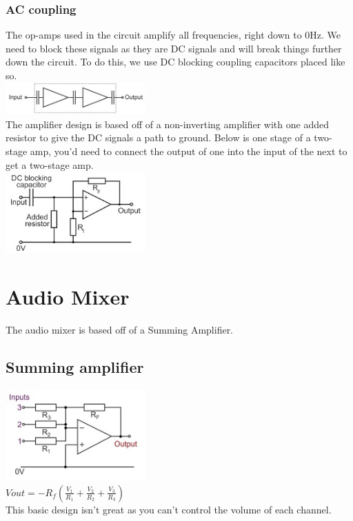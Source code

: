 \documentclass[a4paper, 11pt, twocolumn]{article}
\begin{document}
    \subsubsection{AC coupling}
    The op-amps used in the circuit amplify all frequencies, right down to 0Hz. We need to block these signals as they are DC signals and will break things further down the circuit. To do this, we use DC blocking coupling capacitors placed like so. \\
    \includegraphics[width=0.4\textwidth]{dcBlock.jpg} \\
    The amplifier design is based off of a non-inverting amplifier with one added resistor to give the DC signals a path to ground. Below is one stage of a two-stage amp, you'd need to connect the output of one into the input of the next to get a two-stage amp. \\
    \includegraphics[width=0.4\textwidth]{singleStageAmp.jpg} \\

    \section{Audio Mixer}
    The audio mixer is based off of a Summing Amplifier.
    \subsection{Summing amplifier}
    \includegraphics[width=0.4\textwidth]{summingAmp.jpg} \\
    $\displaystyle Vout = -R_f(\frac{V_1}{R_1} + \frac{V_2}{R_2} + \frac{V_3}{R_3})$ \\
    This basic design isn't great as you can't control the volume of each channel.
\end{document}
